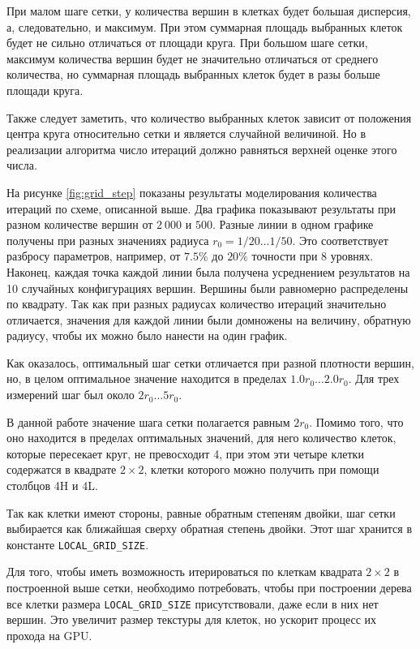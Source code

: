 При малом шаге сетки, у количества вершин в клетках будет большая дисперсия, а, следовательно, и максимум. При этом суммарная площадь выбранных клеток будет не сильно отличаться от площади круга. При большом шаге сетки, максимум количества вершин будет не значительно отличаться от среднего количества, но суммарная площадь выбранных клеток будет в разы больше площади круга.

Также следует заметить, что количество выбранных клеток зависит от положения центра круга относительно сетки и является случайной величиной. Но в реализации алгоритма число итераций должно равняться верхней оценке этого числа.

На рисунке \ref{fig:grid_step} показаны результаты моделирования количества итераций по схеме, описанной выше. Два графика показывают результаты при разном количестве вершин от $2\ 000$ и $500$. Разные линии в одном графике получены при разных значениях радиуса $r_0 = 1 / 20 \ldots 1 / 50$. Это соответствует разбросу параметров, например, от $7.5\%$ до $20\%$ точности при 8 уровнях. Наконец, каждая точка каждой линии была получена усреднением результатов на 10 случайных конфигурациях вершин. Вершины были равномерно распределены по квадрату. Так как при разных радиусах количество итераций значительно отличается, значения для каждой линии были домножены на величину, обратную радиусу, чтобы их можно было нанести на один график.

Как оказалось, оптимальный шаг сетки отличается при разной плотности вершин, но, в целом оптимальное значение находится в пределах $1.0 r_0 \ldots 2.0 r_0$. Для трех измерений шаг был около $2r_0\ldots 5r_0$.

В данной работе значение шага сетки полагается равным $2r_0$. Помимо того, что оно находится в пределах оптимальных значений, для него количество клеток, которые пересекает круг, не превосходит 4, при этом эти четыре клетки содержатся в квадрате $2\times 2$, клетки которого можно получить при помощи столбцов 4H и 4L.

Так как клетки имеют стороны, равные обратным степеням двойки, шаг сетки выбирается как ближайшая сверху обратная степень двойки. Этот шаг хранится в константе \texttt{LOCAL\_GRID\_SIZE}.

Для того, чтобы иметь возможность итерироваться по клеткам квадрата $2\times 2$ в построенной выше сетки, необходимо потребовать, чтобы при построении дерева все клетки размера \texttt{LOCAL\_GRID\_SIZE} присутствовали, даже если в них нет вершин. Это увеличит размер текстуры для клеток, но ускорит процесс их прохода на GPU.

